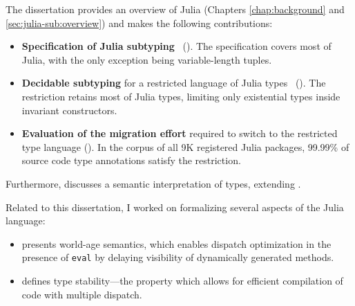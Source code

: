 The dissertation provides an overview of Julia
(Chapters \ref{chap:background} and \ref{sec:julia-sub:overview})
and makes the following contributions:
\begin{itemize}
  \item \textbf{Specification of Julia
    subtyping}~\citep*{bib:zappa-nardelli:julia-sub:oopsla:2018}
    ().
    The specification covers most of Julia, with the only exception being
    variable-length tuples.
  \item \textbf{Decidable subtyping} for a restricted language of Julia 
    types~\citep*{bib:belyakova:julia-sub-dec:draft} ().
    The restriction retains most of Julia types, limiting only existential types
    inside invariant constructors.
  \item \textbf{Evaluation of the migration effort} required to switch to 
    the restricted type language (). 
    In the corpus of all 9K registered Julia packages, 99.99\% of source code 
    type annotations satisfy the restriction.
\end{itemize}
Furthermore,  discusses a semantic interpretation
of types, extending \cite{bib:belyakova:minijl-sub:ftfjp:2019}.

Related to this dissertation, I worked on formalizing several aspects of the
Julia language:
\begin{itemize}
  \item \citep*{bib:belyakova:world-age:oopsla:2020} presents 
    world-age semantics, which enables dispatch optimization in the presence
    of \texttt{eval} by delaying visibility of dynamically generated methods.
  \item \citep*{bib:pelenitsyn:type-stability:oopsla:2021} defines type
    stability---the property which allows for efficient compilation of code with
    multiple dispatch.
\end{itemize}
